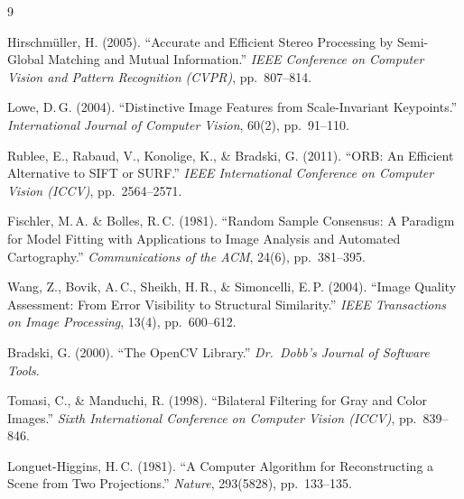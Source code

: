 \documentclass[a4paper,12pt]{article}
\begin{document}
\begin{thebibliography}{9}

Hirschm\"uller, H. (2005).
``Accurate and Efficient Stereo Processing by Semi-Global Matching and Mutual Information.''
\textit{IEEE Conference on Computer Vision and Pattern Recognition (CVPR)}, pp.~807--814.

Lowe, D.\,G. (2004).
``Distinctive Image Features from Scale-Invariant Keypoints.''
\textit{International Journal of Computer Vision}, 60(2), pp.~91--110.

Rublee, E., Rabaud, V., Konolige, K., \& Bradski, G. (2011).
``ORB: An Efficient Alternative to SIFT or SURF.''
\textit{IEEE International Conference on Computer Vision (ICCV)}, pp.~2564--2571.

Fischler, M.\,A. \& Bolles, R.\,C. (1981).
``Random Sample Consensus: A Paradigm for Model Fitting with Applications to Image Analysis and Automated Cartography.''
\textit{Communications of the ACM}, 24(6), pp.~381--395.

Wang, Z., Bovik, A.\,C., Sheikh, H.\,R., \& Simoncelli, E.\,P. (2004).
``Image Quality Assessment: From Error Visibility to Structural Similarity.''
\textit{IEEE Transactions on Image Processing}, 13(4), pp.~600--612.

Bradski, G. (2000).
``The OpenCV Library.''
\textit{Dr.\ Dobb's Journal of Software Tools}.

Tomasi, C., \& Manduchi, R. (1998).
``Bilateral Filtering for Gray and Color Images.''
\textit{Sixth International Conference on Computer Vision (ICCV)}, pp.~839--846.

Longuet-Higgins, H.\,C. (1981).
``A Computer Algorithm for Reconstructing a Scene from Two Projections.''
\textit{Nature}, 293(5828), pp.~133--135.

\end{thebibliography}
\end{document}
